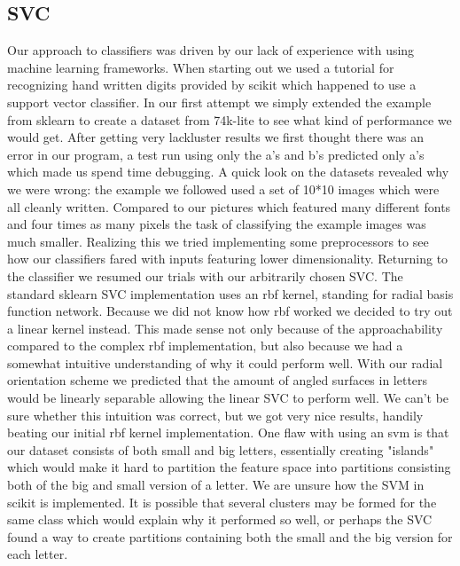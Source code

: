 \documentclass[paper=a4, fontsize=11pt]{scrartcl} %
\numberwithin{equation}{section} %
\numberwithin{figure}{section} %
\numberwithin{table}{section} %
\begin{document}
\subsection{SVC}
Our approach to classifiers was driven by our lack of experience with using machine learning frameworks.
When starting out we used a tutorial for recognizing hand written digits provided by scikit which happened to use a support vector classifier. %
In our first attempt we simply extended the example from sklearn to create a dataset from 74k-lite to see what kind of performance we would get.
After getting very lackluster results we first thought there was an error in our program, a test run using only the a's and b's predicted only a's which made us spend time debugging.
A quick look on the datasets revealed why we were wrong: the example we followed used a set of 10*10 images which were all cleanly written. 
Compared to our pictures which featured many different fonts and four times as many pixels the task of classifying the example images was much smaller.
Realizing this we tried implementing some preprocessors to see how our classifiers fared with inputs featuring lower dimensionality.
Returning to the classifier we resumed our trials with our arbitrarily chosen SVC.
The standard sklearn SVC implementation uses an rbf kernel, standing for radial basis function network.
Because we did not know how rbf worked we decided to try out a linear kernel instead.
This made sense not only because of the approachability compared to the complex rbf implementation, but also because we had a somewhat intuitive understanding of why it could perform well.
With our radial orientation scheme we predicted that the amount of angled surfaces in letters would be linearly separable allowing the linear SVC to perform well.
We can't be sure whether this intuition was correct, but we got very nice results, handily beating our initial rbf kernel implementation.
One flaw with using an svm is that our dataset consists of both small and big letters, essentially creating "islands" which would make it hard to partition the feature space into partitions consisting both of the big and small version of a letter.
We are unsure how the SVM in scikit is implemented. 
It is possible that several clusters may be formed for the same class which would explain why it performed so well, or perhaps the SVC found a way to create partitions containing both the small and the big version for each letter.
\end{document}
